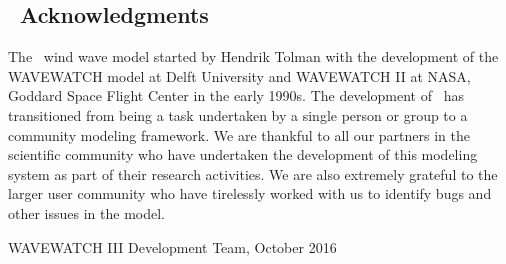 \vssub
\subsection{~Acknowledgments}
\vssub

The \ws\ wind wave model started by Hendrik Tolman with the development of the WAVEWATCH model at Delft University and WAVEWATCH II at NASA, Goddard Space Flight Center in the early 1990s.  
The development of \ws\ has transitioned from being a task undertaken by a single person or group to a community modeling framework. We are thankful to all our partners in the scientific community who have undertaken the development of this modeling system as part of their research activities. We are also extremely grateful to the larger user community who have tirelessly worked with us to identify bugs and other issues in the model. 

\vspace{\baselineskip}
\vspace{\baselineskip} 
\strut \hfill WAVEWATCH III Development Team, October 2016

